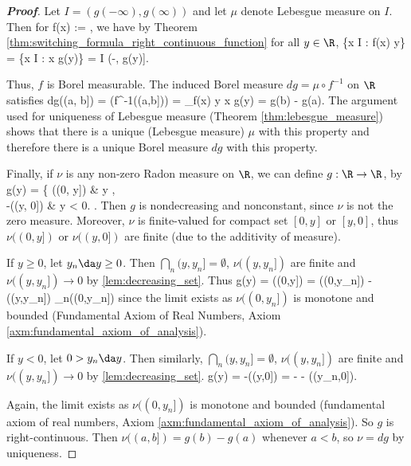 \begin{proof}[\bf Proof]%
Let $I = (g(-\infty), g(\infty))$ and let $\mu$ denote Lebesgue measure on $I$. Then for
\be
f(x) := \inf{},
\ee
we have by Theorem \ref{thm:switching_formula_right_continuous_function} for all $y \in \R$,
\be
\{x \in I : f(x) \leq y\} = \{x \in I : x \leq g(y)\} = I \cap (-\infty, g(y)].
\ee

Thus, $f$ is Borel measurable. The induced Borel measure $dg = \mu\circ f^{-1}$ on $\R$ satisfies
\be
dg((a, b]) = \mu(f^{-1}((a,b])) = \underbrace{\mu\bb{\{x : f(x) > a \text{ and }f(x) \leq b\}} = \mu\bb{(g(a), g(b)]} }_{f(x) \leq y x \leq g(y)} = g(b) - g(a).
\ee
The argument used for uniqueness of Lebesgue measure (Theorem \ref{thm:lebesgue_measure}) shows that there is a unique (Lebesgue measure) $\mu$ with this property and therefore there is a unique Borel measure $dg$ with this property.

Finally, if $\nu$ is any non-zero Radon measure on $\R$, we can define $g : \R \to \R$, by
\be
g(y) = \left\{
\nu((0, y]) & y ,\\
-\nu((y, 0]) \quad\quad & y < 0.
\ea\right.
\ee
Then $g$ is nondecreasing and nonconstant, since $\nu$ is not the zero measure. Moreover, $\nu$ is finite-valued for compact set $[0,y]$ or $[y,0]$, thus $\nu((0,y])$ or $\nu((y,0])$ are finite (due to the additivity of measure).

If $y\geq 0$, let $y_n \da y \geq 0$. Then $\bigcap_n(y,y_n] = \emptyset$, $\nu((y,y_n])$ are finite and $\nu((y,y_n]) \to 0$ by \ref{lem:decreasing_set}. Thus
\be
g(y) = \nu((0,y]) = \nu((0,y_n]) - \nu((y,y_n]) \to \lim_{n\to \infty}\nu((0,y_n])
\ee
since the limit exists as $\nu((0,y_n])$ is monotone and bounded (Fundamental Axiom of Real Numbers, Axiom \ref{axm:fundamental_axiom_of_analysis}).

If $y<0$, let $0 >y_n\da y$. Then similarly, $\bigcap_n(y,y_n] = \emptyset$, $\nu((y,y_n])$ are finite and $\nu((y,y_n]) \to 0$ by \ref{lem:decreasing_set}.
\be
g(y) = -\nu((y,0]) = -\bb{\nu((y,y_n])+ \nu((y_n,0])} \to - \lim\nu((y_n,0]).
\ee

Again, the limit exists as $\nu((0,y_n])$ is monotone and bounded (fundamental axiom of real numbers, Axiom \ref{axm:fundamental_axiom_of_analysis}). So $g$ is right-continuous. Then $\nu((a, b]) = g(b)-g(a)$ whenever $a < b$, so $\nu = dg$ by uniqueness.
\end{proof}

